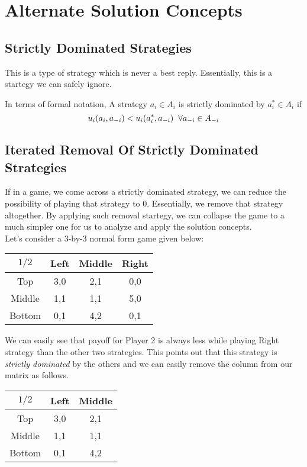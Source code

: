 \section{Alternate Solution Concepts}

\subsection{Strictly Dominated Strategies}
This is a type of strategy which is never a best reply. Essentially, this is a startegy we can safely ignore.

In terms of formal notation, A strategy $a_i \in A_i$ is strictly dominated by $a_i^* \in A_i$ if $$u_i(a_i, a_{-i}) < u_i(a_i^*, a_{-i}) \hspace{0.2cm} \forall a_{-i} \in A_{-i}$$

\subsection{Iterated Removal Of Strictly Dominated Strategies}

If in a game, we come across a strictly dominated strategy, we can reduce the possibility of playing that strategy to $0$. Essentially, we remove that strategy altogether. By applying such removal startegy, we can collapse the game to a much simpler one for us to analyze and apply the solution concepts.\\

Let's consider a 3-by-3 normal form game given below:\\
		\begin{center}
		\begin{tabular}{|c|c|c|c|}\hline
		$1/2$ & Left & Middle & Right\\ \hline
		Top &  3,0 & 2,1 & 0,0 \\ \hline
		Middle & 1,1 & 1,1 & 5,0 \\ \hline
		Bottom & 0,1 & 4,2 & 0,1 \\ \hline
		\end{tabular}
		\end{center}
		
We can easily see that payoff for Player 2 is always less while playing Right strategy than the other two strategies. This points out that this strategy is \textit{strictly dominated} by the others and we can easily remove the column from our matrix as follows.

		\begin{center}
		\begin{tabular}{|c|c|c|}\hline
		$1/2$ & Left & Middle \\ \hline
		Top &  3,0 & 2,1  \\ \hline
		Middle & 1,1 & 1,1 \\ \hline
		Bottom & 0,1 & 4,2 \\ \hline
		\end{tabular}
		\end{center}
		

